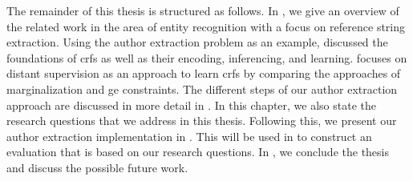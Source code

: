 The remainder of this thesis is structured as follows.
In , we give an overview of the related work in the area of entity recognition with a focus on reference string extraction.
Using the author extraction problem as an example,  discussed the foundations of \glspl{crf} as well as their encoding, inferencing, and learning.
 focuses on distant supervision as an approach to learn \glspl{crf} by comparing the approaches of marginalization and \gls{ge} constraints.
The different steps of our author extraction approach are discussed in more detail in .
In this chapter, we also state the research questions that we address in this thesis.
Following this, we present our author extraction implementation in .
This will be used in  to construct an evaluation that is based on our research questions.
In , we conclude the thesis and discuss the possible future work.

